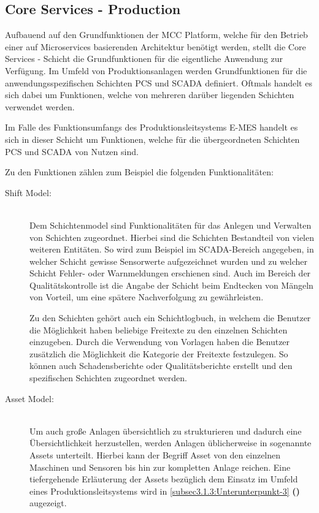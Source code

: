 \subsection{Core Services - Production\label{subsec3.1.2:Unterunterpunkt-2}}

Aufbauend auf den Grundfunktionen der \glqq MCC Platform\grqq{}, welche für den Betrieb einer auf Microservices basierenden Architektur benötigt werden, stellt die \glqq Core Services\grqq{} - Schicht die Grundfunktionen für die eigentliche Anwendung zur Verfügung. Im Umfeld von Produktionsanlagen werden Grundfunktionen für die anwendungsspezifischen Schichten \glqq PCS\grqq{} und \glqq SCADA\grqq{} definiert. Oftmals handelt es sich dabei um Funktionen, welche von mehreren darüber liegenden Schichten verwendet werden.

Im Falle des Funktionsumfangs des Produktionsleitsystems \glqq E-MES\grqq{} handelt es sich in dieser Schicht um Funktionen, welche für die übergeordneten Schichten \glqq PCS\grqq{} und \glqq SCADA\grqq{} von Nutzen sind.

Zu den Funktionen zählen zum Beispiel die folgenden Funktionalitäten:

\begin{description}

    \item[Shift Model:]\hfill \\
    Dem Schichtenmodel sind Funktionalitäten für das Anlegen und Verwalten von Schichten zugeordnet. Hierbei sind die Schichten Bestandteil von vielen weiteren Entitäten. So wird zum Beispiel im SCADA-Bereich angegeben, in welcher Schicht gewisse Sensorwerte aufgezeichnet wurden und zu welcher Schicht Fehler- oder Warnmeldungen erschienen sind. Auch im Bereich der Qualitätskontrolle ist die Angabe der Schicht beim Endtecken von Mängeln von Vorteil, um eine spätere Nachverfolgung zu gewährleisten.

    Zu den Schichten gehört auch ein Schichtlogbuch, in welchem die Benutzer die Möglichkeit haben beliebige Freitexte zu den einzelnen Schichten einzugeben. Durch die Verwendung von Vorlagen haben die Benutzer zusätzlich die Möglichkeit die Kategorie der Freitexte festzulegen. So können auch Schadensberichte oder Qualitätsberichte erstellt und den spezifischen Schichten zugeordnet werden.

    \item[Asset Model:]\hfill \\
    Um auch große Anlagen übersichtlich zu strukturieren und dadurch eine Übersichtlichkeit herzustellen, werden Anlagen üblicherweise in sogenannte \glqq Assets\grqq{} unterteilt. Hierbei kann der Begriff \glqq Asset\grqq{} von den einzelnen Maschinen und Sensoren bis hin zur kompletten Anlage reichen. Eine tiefergehende Erläuterung der \glqq Assets\grqq{} bezüglich dem Einsatz im Umfeld eines Produktionsleitsystems wird in \autoref{subsec3.1.3:Unterunterpunkt-3} \textbf{()} augezeigt.

\end{description}


